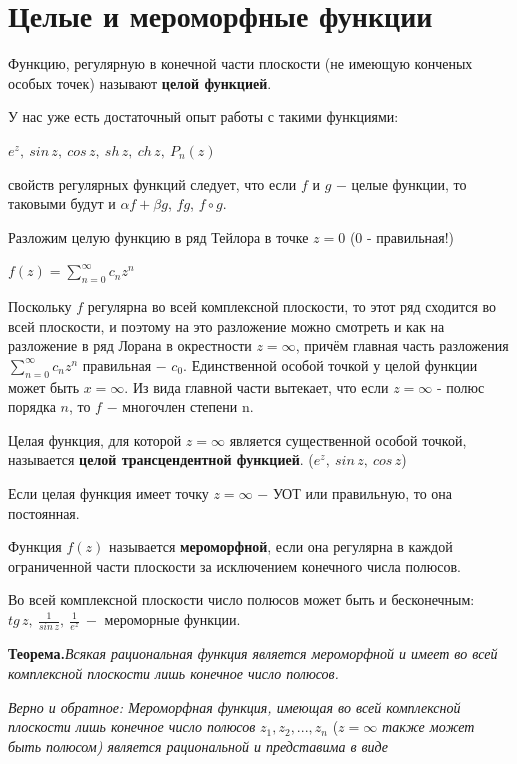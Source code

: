 \documentclass[a4paper, 12pt]{report}
\begin{document}
	\section{Целые и мероморфные функции}
Функцию, регулярную в конечной части плоскости (не имеющую конченых особых точек) называют \textbf{целой функцией}.
\par\bigskip
У нас уже есть достаточный опыт работы с такими функциями:
\begin{center}
    $e^z,\ sin\,z,\ cos\,z,\ sh\,z,\ ch\,z,\ P_n(z)$
\end{center}
 свойств регулярных функций следует, что если $f$ и $g$ $-$ целые функции, то таковыми будут и $\alpha f + \beta g$, $fg$, $f\circ g$.
\par\bigskip
Разложим целую функцию в ряд Тейлора в точке $z=0$ (0 - правильная!)
\begin{center}
    $f(z) = \sum\limits_{n=0}^\infty c_n z^n$
\end{center}
\par Поскольку $f$ регулярна во всей комплексной плоскости, то этот ряд сходится во всей плоскости, и поэтому на это разложение можно смотреть и как на разложение в ряд Лорана в окрестности $z = \infty$, причём главная часть разложения $\sum\limits_{n=0}^\infty c_n z^n$ правильная $-$ $c_0$. Единственной особой точкой у целой функции может быть $x = \infty$. Из вида главной части вытекает, что если $z = \infty$ - полюс порядка $n$, то $f$ $-$ многочлен степени n. 
\par\bigskip Целая функция, для которой $z = \infty$ является существенной особой точкой, называется \textbf{целой трансцендентной функцией}. ($e^z,\ sin\,z,\ cos\,z$)
\par\bigskip Если целая функция имеет точку $z = \infty$ $-$ УОТ или правильную, то она постоянная.
\par\bigskip Функция $f(z)$ называется \textbf{мероморфной}, если она регулярна в каждой ограниченной части плоскости за исключением конечного числа полюсов.
\par\bigskip Во всей комплексной плоскости число полюсов может быть и бесконечным: $tg\,z,\ \frac{1}{sin\, z},\ \frac{1}{e^z}\ - $ мероморные функции.
\par\bigskip \textbf{Теорема.}\quad \textit{Всякая рациональная функция является мероморфной и имеет во всей комплексной плоскости лишь конечное число полюсов.}
\par \textit{Верно и обратное: Мероморфная функция, имеющая во всей комплексной плоскости лишь конечное число полюсов} $z_1, z_2, ..., z_n$ ($z = \infty$ \textit{также может быть полюсом) является рациональной и представима в виде}
\end{document}
